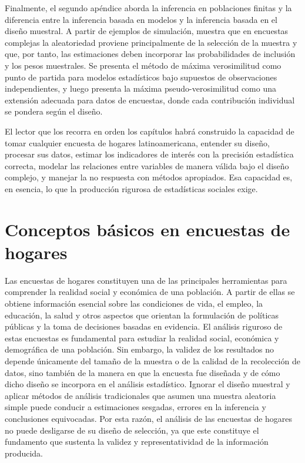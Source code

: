\documentclass[
  spanish,
  12pt,
]{book}
\begin{document}
Finalmente, el segundo apéndice aborda la inferencia en poblaciones finitas y la diferencia entre la inferencia basada en modelos y la inferencia basada en el diseño muestral. A partir de ejemplos de simulación, muestra que en encuestas complejas la aleatoriedad proviene principalmente de la selección de la muestra y que, por tanto, las estimaciones deben incorporar las probabilidades de inclusión y los pesos muestrales. Se presenta el método de máxima verosimilitud como punto de partida para modelos estadísticos bajo supuestos de observaciones independientes, y luego presenta la máxima pseudo-verosimilitud como una extensión adecuada para datos de encuestas, donde cada contribución individual se pondera según el diseño.

El lector que los recorra en orden los capítulos habrá construido la capacidad de tomar cualquier encuesta de hogares latinoamericana, entender su diseño, procesar sus datos, estimar los indicadores de interés con la precisión estadística correcta, modelar las relaciones entre variables de manera válida bajo el diseño complejo, y manejar la no respuesta con métodos apropiados. Esa capacidad es, en esencia, lo que la producción rigurosa de estadísticas sociales exige.

\chapter{Conceptos básicos en encuestas de hogares}\label{cap2}

Las encuestas de hogares constituyen una de las principales herramientas para comprender la realidad social y económica de una población. A partir de ellas se obtiene información esencial sobre las condiciones de vida, el empleo, la educación, la salud y otros aspectos que orientan la formulación de políticas públicas y la toma de decisiones basadas en evidencia. El análisis riguroso de estas encuestas es fundamental para estudiar la realidad social, económica y demográfica de una población. Sin embargo, la validez de los resultados no depende únicamente del tamaño de la muestra o de la calidad de la recolección de datos, sino también de la manera en que la encuesta fue diseñada y de cómo dicho diseño se incorpora en el análisis estadístico. Ignorar el diseño muestral y aplicar métodos de análisis tradicionales que asumen una muestra aleatoria simple puede conducir a estimaciones sesgadas, errores en la inferencia y conclusiones equivocadas. Por esta razón, el análisis de las encuestas de hogares no puede desligarse de su diseño de selección, ya que este constituye el fundamento que sustenta la validez y representatividad de la información producida.
\end{document}
